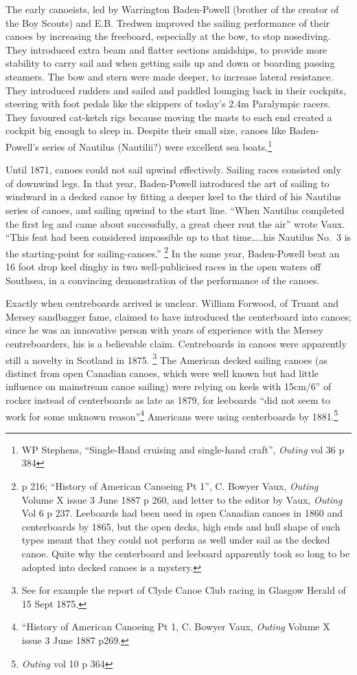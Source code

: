 \documentclass[
  letterpaper,
]{scrbook}
\begin{document}
The early canoeists, led by Warrington Baden-Powell (brother of the
creator of the Boy Scouts) and E.B. Tredwen improved the sailing
performance of their canoes by increasing the freeboard, especially at
the bow, to stop nosediving. They introduced extra beam and flatter
sections amidships, to provide more stability to carry sail and when
getting sails up and down or boarding passing steamers. The bow and
stern were made deeper, to increase lateral resistance. They introduced
rudders and sailed and paddled lounging back in their cockpits, steering
with foot pedals like the skippers of today's 2.4m Paralympic racers.
They favoured cat-ketch rigs because moving the masts to each end
created a cockpit big enough to sleep in. Despite their small size,
canoes like Baden-Powell's series of Nautilus (Nautilii?) were excellent
sea boats.\footnote{WP Stephens, ``Single-Hand cruising and single-hand
  craft'', \emph{Outing} vol 36 p 384}

Until 1871, canoes could not sail upwind effectively. Sailing races
consisted only of downwind legs. In that year, Baden-Powell introduced
the art of sailing to windward in a decked canoe by fitting a deeper
keel to the third of his Nautilus series of canoes, and sailing upwind
to the start line. ``When Nautilus completed the first leg and came
about successfully, a great cheer rent the air'' wrote Vaux. ``This feat
had been considered impossible up to that time\ldots..his Nautilus No.~3
is the starting-point for sailing-canoes.'' \footnote{p 216; ``History
  of American Canoeing Pt 1'', C. Bowyer Vaux, \emph{Outing} Volume X
  issue 3 June 1887 p 260, and letter to the editor by Vaux,
  \emph{Outing} Vol 6 p 237. Leeboards had been used in open Canadian
  canoes in 1860 and centerboards by 1865, but the open decks, high ends
  and hull shape of such types meant that they could not perform as well
  under sail as the decked canoe. Quite why the centerboard and leeboard
  apparently took so long to be adopted into decked canoes is a mystery.}
In the same year, Baden-Powell beat an 16 foot drop keel dinghy in two
well-publicised races in the open waters off Southsea, in a convincing
demonstration of the performance of the canoes.

Exactly when centreboards arrived is unclear. William Forwood, of Truant
and Mersey sandbagger fame, claimed to have introduced the centerboard
into canoes; since he was an innovative person with years of experience
with the Mersey centreboarders, his is a believable claim. Centreboards
in canoes were apparently still a novelty in Scotland in 1875.
\footnote{See for example the report of Clyde Canoe Club racing in
  Glasgow Herald of 15 Sept 1875.} The American decked sailing canoes
(as distinct from open Canadian canoes, which were well known but had
little influence on mainstream canoe sailing) were relying on keels with
15cm/6'' of rocker instead of centerboards as late as 1879, for
leeboards ``did not seem to work for some unknown reason''\footnote{``History
  of American Canoeing Pt 1, C. Bowyer Vaux, \emph{Outing} Volume X
  issue 3 June 1887 p269.} Americans were using centerboards by
1881.\footnote{\emph{Outing} vol 10 p 364}
\end{document}
